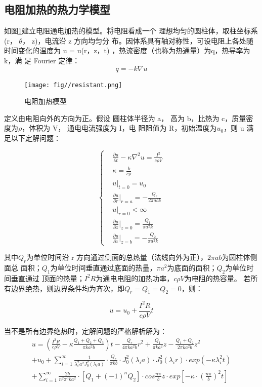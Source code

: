\documentclass[10pt,a4paper,twoside,UTF8]{ctexart}
\begin{document}
\subsection{电阻加热的热力学模型}
如图\ref{fig: model1}建立电阻通电加热的模型。将电阻看成一个
理想均匀的圆柱体，取柱坐标系(r， $\theta$， z)，电流沿 z 方向均匀分
布。因体系具有轴对称性，可设电阻上各处随时间变化的温度为
u = u(r，z，t) ，热流密度（也称为热通量）为q，热导率为k，满
足 Fourier 定律：
\begin{equation*}
	q=-k\nabla u	
\end{equation*}

\begin{figure}[H]
	\centering
	\texttt{[image: fig//resistant.png]}
	\caption{电阻加热模型}
	\label{fig: model1}
\end{figure}

定义由电阻向外的方向为正。假设
圆柱体半径为 a， 高为 b，比热为 c，质量密度为$\rho$，体积为 V， 通电电流强度为 I，电
阻阻值为 R，初始温度为$u_0$，则 u 满足以下定解问题：

\[\left\{
\begin{aligned}
&\frac{\partial u}{\partial t}-\kappa \nabla^2 u=\frac{I^2}{c\rho V}\\
&\kappa=\frac{k}{c\rho}\\
&u|_{t=0}=u_0\\
&\frac{\partial u}{\partial r}|_{r=a}=-\frac{Q_r}{2\pi abk}\\
&u|_{r=0}< \infty\\
&\frac{\partial u}{\partial z}|_{z=0}=\frac{Q_1}{\pi a^2 k}\\
&\frac{\partial u}{\partial z}|_{z=b}=-\frac{Q_2}{\pi a^2 k}
\end{aligned}
\right.
\]

其中$Q_r$为单位时间沿 r 方向通过侧面的总热量（法线向外为正），$2\pi ab$为圆柱体侧面总
面积；$Q_1$为单位时间垂直通过底面的热量，$\pi a^2$为底面的面积；$Q_2$为单位时间垂直通过
顶面的热量；$I^2R$为通电电阻的加热功率，$c\rho V$为电阻的热容量。
若所有边界绝热，则边界条件均为齐次，即$Q_r = Q_1 = Q_2 = 0$，则：

\begin{equation*}
	u=u_0+\frac{I^2 R}{c\rho V}t
\end{equation*}

当不是所有边界绝热时，定解问题的严格解析解为：
\begin{equation*}
	\begin{aligned}
	u=\left(\frac{I^2 R}{c\rho V}-\kappa\frac{Q_1+Q_2+Q_3}{\pi k a^2 b}\right)t-\frac{Q_r}{4\pi k a^2 b}r^2+\frac{Q_1}{\pi ka^2}z-\frac{Q_1+Q_2}{2\pi k a^2 b}z^2\\
	+u_0+\sum_{i = 1}^{\infty} \frac{1}{\lambda^2_i a^2 J^2_0 (\lambda_i a)}\cdot\frac{Q_r}{\pi k b}\cdot J^2_0 (\lambda_i a) \cdot J^2_0 (\lambda_i r)\cdot exp(-\kappa \lambda^2_i t)\\
	+\sum_{i = 1}^{\infty} \frac{2b}{n^2 \pi^3 k a^2}\cdot[Q_1+(-1)^n Q_2] \cdot cos\frac{n\pi }{b}z\cdot exp[-\kappa\cdot(\frac{n\pi}{b})^2 t]
	\end{aligned}
\end{equation*}
\end{document}
